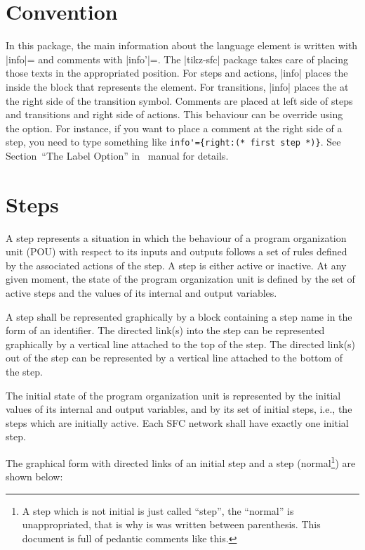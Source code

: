 \documentclass[a4paper]{ltxdoc}
\begin{document}
\section{Convention}
In this package, the main information about the language element is written with |info|= and comments with |info'|=. The |tikz-sfc| package takes care of placing those texts in the appropriated position. For steps and actions, |info| places the  inside the block that represents the element. For transitions, |info| places the  at the right side of the transition symbol. Comments are placed at left side of steps and transitions and right side of actions. This behaviour can be override using the  option. For instance, if you want to place a comment at the right side of a step, you need to type something like \verb|info'={right:(* first step *)}|. See Section~``The Label Option'' in \tikzname\ manual for details.


\section{Steps}
A step represents a situation in which the behaviour of a program organization unit (POU) with respect to its inputs and outputs follows a set of rules defined by the associated actions of the step. A step is either active or inactive. At any given moment, the state of the program organization unit is defined by the set of active steps and the values of its internal and output variables.

A step shall be represented graphically by a block containing a step name in the form of an identifier. The directed link(s) into the step can be represented graphically by a vertical line attached to the top of the step. The directed link(s) out of the step can be represented by a vertical line attached to the bottom of the step.

The initial state of the program organization unit is represented by the initial values of its internal and output variables, and by its set of initial steps, i.e., the steps which are initially active. Each SFC network shall have exactly one initial step.

The graphical form with directed links of an initial step and a step (normal\footnote{A step which is not initial is just called ``step'', the ``normal'' is unappropriated, that is why is was written between parenthesis. This document is full of pedantic comments like this.}) are shown below:
\end{document}
